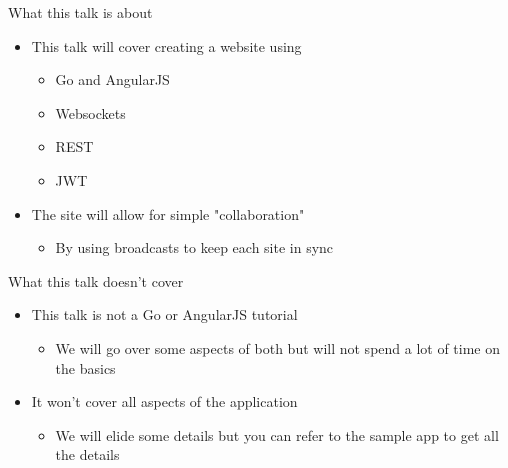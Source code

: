 \documentclass[presentation]{beamer}
\begin{document}
\begin{frame}[label=sec-1-3]{What this talk is about}
\begin{itemize}
\item This talk will cover creating a website using
\begin{itemize}
\item Go and AngularJS
\item Websockets
\item REST
\item JWT
\end{itemize}
\item The site will allow for simple "collaboration"
\begin{itemize}
\item By using broadcasts to keep each site in sync
\end{itemize}
\end{itemize}
\end{frame}

\begin{frame}[label=sec-1-4]{What this talk doesn't cover}
\begin{itemize}
\item This talk is not a Go or AngularJS tutorial
\begin{itemize}
\item We will go over some aspects of both but will not spend a lot of time on the basics
\end{itemize}
\item It won't cover all aspects of the application
\begin{itemize}
\item We will elide some details but you can refer to the sample app to get all the details
\end{itemize}
\end{itemize}
\end{frame}
\end{document}
